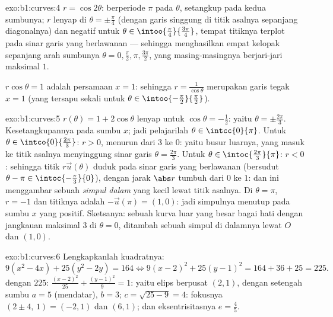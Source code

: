 \begin{solution}{exo:b1:curves:4}
$r = \cos 2\theta$: berperiode $\pi$ pada $\theta$, setangkup pada kedua
sumbunya; $r$ lenyap di $\theta = \pm\frac\pi4$ (dengan garis singgung di
titik asalnya sepanjang diagonalnya) dan negatif untuk $\theta \in
\intoo{\frac\pi4}{\frac{3\pi}{4}}$, tempat titiknya terplot pada
sinar garis yang berlawanan --- sehingga menghasilkan empat kelopak sepanjang arah sumbunya
$\theta = 0, \frac\pi2, \pi, \frac{3\pi}{2}$, yang masing-masingnya berjari-jari
maksimal $1$.

$r\cos\theta = 1$ adalah persamaan $x = 1$: sehingga  $r =
\frac{1}{\cos\theta}$ merupakan garis tegak $x = 1$ (yang tersapu sekali untuk
$\theta \in \intoo{-\frac\pi2}{\frac\pi2}$).
\end{solution}

\begin{solution}{exo:b1:curves:5}
$r(\theta) = 1 + 2\cos\theta$ lenyap untuk $\cos\theta = -\frac12$:
yaitu $\theta = \pm\frac{2\pi}{3}$. Kesetangkupannya pada sumbu $x$; jadi pelajarilah
$\theta \in \intcc{0}{\pi}$. Untuk $\theta \in
\intco{0}{\frac{2\pi}{3}}$: $r > 0$, menurun dari $3$ ke $0$: yaitu
busur luarnya, yang masuk ke titik asalnya menyinggung sinar garis $\theta =
\frac{2\pi}{3}$. Untuk $\theta \in \intoc{\frac{2\pi}{3}}{\pi}$: $r <
0$: sehingga titik $r\vec u(\theta)$ duduk pada sinar garis yang berlawanan (bersudut
$\theta - \pi \in \intoc{-\frac\pi3}{0}$), dengan jarak $\abs r$
tumbuh dari $0$ ke $1$: dan ini menggambar sebuah \emph{simpul dalam} yang kecil
lewat titik asalnya. Di $\theta = \pi$, $r = -1$ dan titiknya adalah
$-\vec u(\pi) = (1, 0)$: jadi simpulnya menutup pada sumbu $x$ yang positif.
Sketsanya: sebuah kurva luar yang besar bagai hati
dengan jangkauan maksimal $3$ di $\theta = 0$, ditambah sebuah simpul di dalamnya
lewat $O$ dan $(1,0)$.
\end{solution}

\begin{solution}{exo:b1:curves:6}
Lengkapkanlah kuadratnya:
\[
9(x^2 - 4x) + 25(y^2 - 2y) = 164
\iff 9(x-2)^2 + 25(y-1)^2 = 164 + 36 + 25 = 225 .
\]
 dengan $225$: $\frac{(x-2)^2}{25} + \frac{(y-1)^2}{9} = 1$: yaitu
elips berpusat $(2, 1)$, dengan setengah sumbu $a = 5$ (mendatar), $b =
3$; $c = \sqrt{25 - 9} = 4$: fokusnya $(2 \pm 4,\, 1) = (-2, 1)$ dan
$(6, 1)$; dan eksentrisitasnya $e = \frac45$.
\end{solution}

